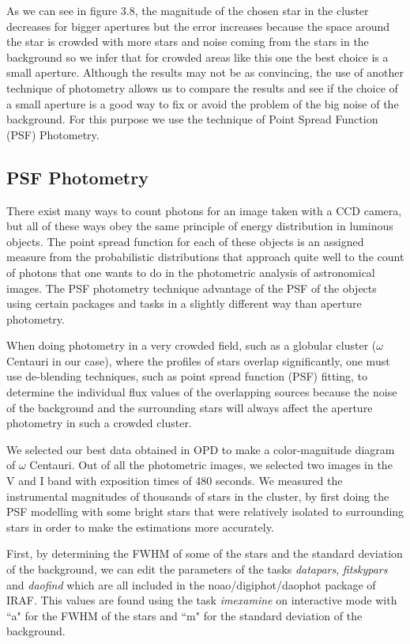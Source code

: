 As we can see in figure 3.8, the magnitude of the chosen star in the cluster decreases for bigger apertures but the error increases because the space around the star is crowded with more stars and noise coming from the stars in the background so we infer that for crowded areas like this one the best choice is a small aperture. Although the results may not be as convincing, the use of another technique of photometry allows us to compare the results and see if the choice of a small aperture is a good way to fix or avoid the problem of the big noise of the background. For this purpose we use the technique of Point Spread Function (PSF) Photometry.

\subsection{PSF Photometry}

There exist many ways to count photons for an image taken with a CCD camera, but all of these ways obey the same principle of energy distribution in luminous objects. The point spread function for each of these objects is an assigned measure from the probabilistic distributions that approach quite well to the count of photons that one wants to do in the photometric analysis of astronomical images. The PSF photometry technique advantage of the PSF of the objects using certain packages and tasks in a slightly different way than aperture photometry.

When doing photometry in a very crowded field, such as a globular cluster ($\omega$ Centauri in our case), where the profiles of stars overlap significantly, one must use de-blending techniques, such as point spread function (PSF) fitting, to determine the individual flux values of the overlapping sources because the noise of the background and the surrounding stars will always affect the aperture photometry in such a crowded cluster. 

We selected our best data obtained in OPD to make a color-magnitude diagram of $\omega$ Centauri. Out of all the photometric images, we selected two images in the V and I band with exposition times of 480 seconds. We measured the instrumental magnitudes of thousands of stars in the cluster, by first doing the PSF modelling with some bright stars that were relatively isolated to surrounding stars in order to make the estimations more accurately.

First, by determining the FWHM of some of the stars and the standard deviation of the background, we can edit the parameters of the tasks \textit{datapars}, \textit{fitskypars} and \textit{daofind} which are all included in the noao/digiphot/daophot package of IRAF. This values are found using the task \textit{imexamine} on interactive mode with ``a" for the FWHM of the stars and ``m" for the standard deviation of the background. 

